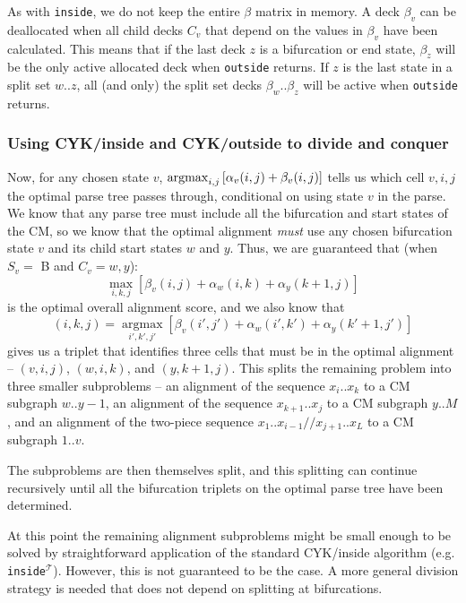 \documentclass[11pt]{article}
\def\argmax{\mathop{\mathrm{argmax}}\limits}
\begin{document}
As with \texttt{inside}, we do not keep the entire $\beta$ matrix in
memory. A deck $\beta_v$ can be deallocated when all child decks $C_v$
that depend on the values in $\beta_v$ have been calculated. This
means that if the last deck $z$ is a bifurcation or end state,
$\beta_z$ will be the only active allocated deck when \texttt{outside}
returns. If $z$ is the last state in a split set $w..z$, all (and
only) the split set decks $\beta_w..\beta_z$ will be active when
\texttt{outside} returns.

\subsubsection{Using CYK/inside and CYK/outside to divide and conquer}

Now, for any chosen state $v$, $\argmax\nolimits_{i,j} \left[ \alpha_{v}(i,j) +
\beta_{v}(i,j) \right]$ tells us which cell $v,i,j$ the optimal parse tree
passes through, conditional on using state $v$ in the parse. We know
that any parse tree must include all the bifurcation and start states
of the CM, so we know that the optimal alignment \emph{must} use any
chosen bifurcation state $v$ and its child start states $w$ and
$y$. Thus, we are guaranteed that (when $S_v =$ B and $C_v = {w,y}$):
\[
   \max_{i,k,j} \left[ \beta_{v}(i,j) + \alpha_{w}(i,k) +
                       \alpha_{y}(k+1,j) \right]
\]
is the optimal overall alignment score, and we also know that
\[
      (i,k,j) = \argmax_{i',k',j'} \left[ \beta_{v}(i',j') +
      \alpha_{w}(i',k') + \alpha_{y}(k'+1,j')  \right]
\]
gives us a triplet that identifies three cells that must be in the
optimal alignment -- $(v,i,j)$, $(w,i,k)$, and $(y,k+1,j)$. This
splits the remaining problem into three smaller subproblems -- an
alignment of the sequence $x_{i}..x_{k}$ to a CM subgraph $w..y-1$, an
alignment of the sequence $x_{k+1}..x_{j}$ to a CM subgraph $y..M$,
and an alignment of the two-piece sequence
$x_1..x_{i-1}//x_{j+1}..x_L$ to a CM subgraph $1..v$.

The subproblems are then themselves split, and this splitting can
continue recursively until all the bifurcation triplets on the optimal
parse tree have been determined.

At this point the remaining alignment subproblems might be small
enough to be solved by straightforward application of the standard
CYK/inside algorithm (e.g. \texttt{inside}$^\mathcal{T}$). However,
this is not guaranteed to be the case. A more general division
strategy is needed that does not depend on splitting at bifurcations.
\end{document}
